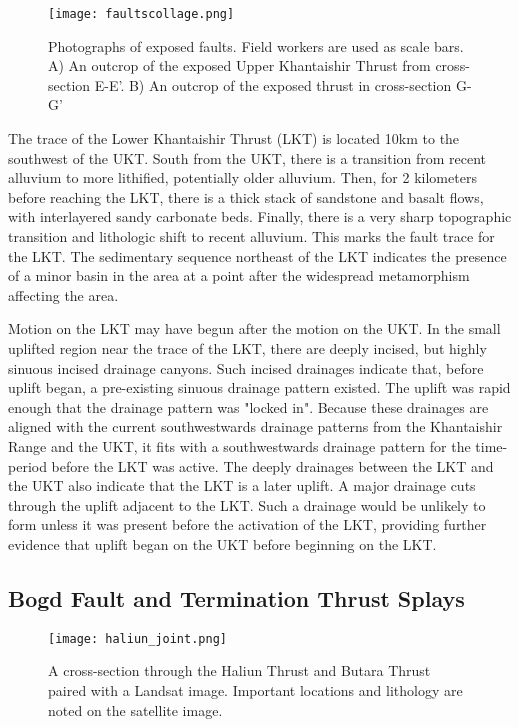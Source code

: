 \begin{figure}[h!]
  \centering
  \texttt{[image: faultscollage.png]}
  \caption{Photographs of exposed faults. Field workers are used as scale bars. A) An outcrop of the exposed Upper Khantaishir Thrust from cross-section E-E'. B) An outcrop of the exposed thrust in cross-section G-G'}
  \label{faultzones}
\end{figure}


The trace of the Lower Khantaishir Thrust (LKT) is located 10km to the southwest of the UKT. South from the UKT, there is a transition from recent alluvium to more lithified, potentially older alluvium. Then, for 2 kilometers before reaching the LKT, there is a thick stack of sandstone and basalt flows, with interlayered sandy carbonate beds. Finally, there is a very sharp topographic transition and lithologic shift to recent alluvium. This marks the fault trace for the LKT. The sedimentary sequence northeast of the LKT indicates the presence of a minor basin in the area at a point after the widespread metamorphism affecting the area.

Motion on the LKT may have begun after the motion on the UKT. In the small uplifted region near the trace of the LKT, there are deeply incised, but highly sinuous incised drainage canyons. Such incised drainages indicate that, before uplift began, a pre-existing sinuous drainage pattern existed. The uplift was rapid enough that the drainage pattern was "locked in". Because these drainages are aligned with the current southwestwards drainage patterns from the Khantaishir Range and the UKT, it fits with a southwestwards drainage pattern for the time-period before the LKT was active. The deeply drainages between the LKT and the UKT also indicate that the LKT is a later uplift. A major drainage cuts through the uplift adjacent to the LKT. Such a drainage would be unlikely to form unless it was present before the activation of the LKT, providing further evidence that uplift began on the UKT before beginning on the LKT.

\subsection{Bogd Fault and Termination Thrust Splays}


\begin{figure}[h!]
  \centering
  \texttt{[image: haliun\_joint.png]}
  \caption{A cross-section through the Haliun Thrust and Butara Thrust paired with a Landsat image. Important locations and lithology are noted on the satellite image.}
  \label{haliun_joint}
\end{figure}

